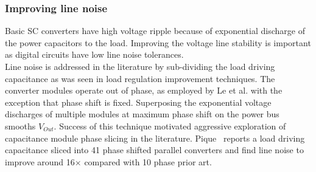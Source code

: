 \documentclass[letterpaper,twocolumn,10pt]{article}
\begin{document}
\subsubsection{Improving line noise }
Basic SC converters have high voltage ripple because of exponential discharge of the power capacitors to the load. Improving the voltage line stability is important as digital circuits have low line noise tolerances.\\ 
Line noise is addressed in the literature by sub-dividing the load driving capacitance as was seen in load regulation improvement techniques. The converter modules operate out of phase, as employed by Le et al. \cite{Phuck2010} with the exception that phase shift is fixed. Superposing the exponential voltage discharges of multiple modules at maximum phase shift on the power bus smooths $V_{Out}$. Success of this technique motivated aggressive exploration of capacitance module phase slicing in the literature. Pique~\cite{Pique2012} reports a load driving capacitance sliced into 41 phase shifted parallel converters and find line noise to improve around 16$\times$ compared with 10 phase prior art.\\ 
\end{document}
